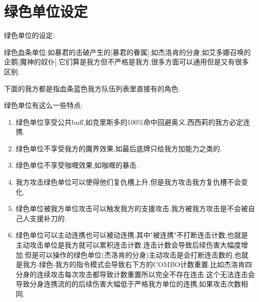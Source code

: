 
\newpage

\section{绿色单位设定}

绿色单位的设定:

绿色血条单位:如暴君的击破产生的[暴君的眷属],如杰洛肯的分身,如艾多娜召唤的企鹅[魔神的奴仆].它们算是我方但不严格是我方,很多方面可以通用但是又有很多区别.

下面的我方都是指血条蓝色我方队伍列表里直接有的角色.

绿色单位有这么一些特点:

\begin{enumerate}
	\item 绿色单位享受公共buff,如克里斯多的100\%命中回避奥义,西西莉的我方必定连携.
	\item 绿色单位不享受我方的魔界效果,如最后底牌只给我方加能力之类的.
	\item 绿色单位不享受咖喱效果,如咖喱的暴击.
	\item 我方攻击绿色单位可以使得他们复仇槽上升,但是我方攻击我方复仇槽不会变化.
	\item 绿色单位被我方单位攻击可以触发我方的支援攻击,我方被我方攻击是不会被自己人支援补刀的.
	\item 绿色单位可以主动连携也可以被动连携.其中"被连携"不打断连击计数,也就是主动攻击单位是我方就可以累积连击计数.连击计数会导致后续伤害大幅度增加.但是可以操作的绿色单位(杰洛肯的分身)主动攻击是会打断连击数的,也就是我方-绿色-我方的指令模式会导致右下方的COMBO计数重置.比如杰洛肯四分身的连续攻击每次攻击都导致计数重置所以完全不存在连击.这个无法连击会导致分身连携流的的后续伤害大幅低于严格我方单位的连携,如果攻击次数相同.
\end{enumerate}